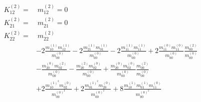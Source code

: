 \begin{align}
\begin{aligned}
    K_{12}^{(2)} =&\ m_{12}^{(2)} = 0\\
    K_{21}^{(2)} =&\ m_{21}^{(2)} = 0\\
    K_{22}^{(2)}
    = &\
    m_{22}^{(2)}
    \\&
    - 2 \frac{ m_{10}^{(1)} m_{12}^{(1)} }{m_{00}^{(0)}}
    - 2 \frac{ m_{21}^{(1)} m_{01}^{(1)} }{m_{00}^{(0)}}
    - 2 \frac{ m_{11}^{(1)} m_{11}^{(1)} }{m_{00}^{(0)}}
    + 2 \frac{ m_{11}^{(0)} m_{11}^{(0)} }{m_{00}^{(0)}}\frac{ m_{00}^{(2)} }{m_{00}^{(0)}}
    \\&
    - \frac{ m_{20}^{(0)} m_{02}^{(2)} }{m_{00}^{(0)}}
    - \frac{ m_{20}^{(2)} m_{02}^{(0)} }{m_{00}^{(0)}}
    + \frac{ m_{20}^{(0)} m_{02}^{(0)} }{m_{00}^{(0)}}\frac{ m_{00}^{(2)} }{m_{00}^{(0)}}
    \\&
    + 2 \frac{ m_{10}^{{(1)}^2} m_{02}^{(0)} }{m_{00}^{{(0)}^2}}
    + 2 \frac{ m_{01}^{{(1)}^2} m_{20}^{(0)} }{m_{00}^{{(0)}^2}}
    + 8 \frac{ m_{10}^{(1)}m_{01}^{(1)} m_{11}^{(0)} }{m_{00}^{{(0)}^2}}
  \end{aligned}
\end{align}
